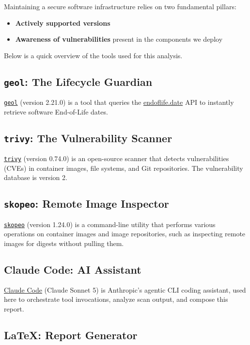 \documentclass[11pt, a4paper]{article}
\begin{document}
Maintaining a secure software infrastructure relies on two fundamental pillars:

\begin{itemize}
    \item \textbf{Actively supported versions}
    \item \textbf{Awareness of vulnerabilities} present in the components we deploy
\end{itemize}

Below is a quick overview of the tools used for this analysis.

\subsection{\texttt{geol}: The Lifecycle Guardian}

\href{https://github.com/opt-nc/geol}{\texttt{geol}} (version 2.21.0) is a tool that queries the \href{https://endoflife.date}{endoflife.date} API to instantly retrieve software End-of-Life dates.

\subsection{\texttt{trivy}: The Vulnerability Scanner}
\href{https://trivy.dev/}{\texttt{trivy}} (version 0.74.0) is an open-source scanner that detects vulnerabilities (CVEs) in container images, file systems, and Git repositories. The vulnerability database is version 2.

\subsection{\texttt{skopeo}: Remote Image Inspector}
\href{https://github.com/containers/skopeo}{\texttt{skopeo}} (version 1.24.0) is a command-line utility that performs various operations on container images and image repositories, such as inspecting remote images for digests without pulling them.

\subsection{Claude Code: AI Assistant}
\href{https://claude.com/product/claude-code}{Claude Code} (Claude Sonnet 5) is Anthropic's agentic CLI coding assistant, used here to orchestrate tool invocations, analyze scan output, and compose this report.

\subsection{\LaTeX{}: Report Generator}
\end{document}
